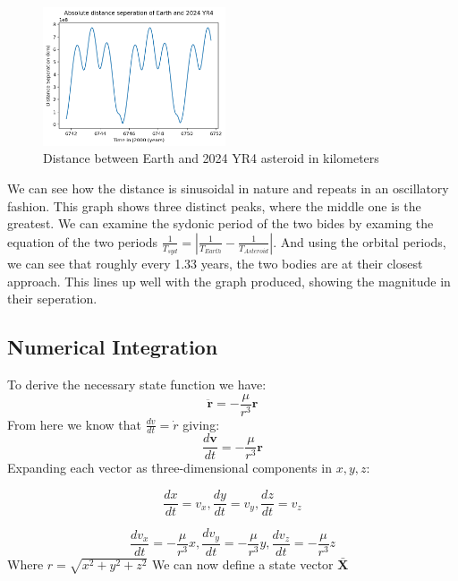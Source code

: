 \documentclass[12pt,twocolumn]{article}  %
\begin{document}
\begin{figure}[H]
    \centering
    \includegraphics[width=0.48\textwidth]{Images/115-dis.png}
    \caption{Distance between Earth and 2024 YR4 asteroid in kilometers}
\end{figure}

\noindent We can see how the distance is sinusoidal in nature and repeats in an oscillatory fashion. 
This graph shows three distinct peaks, where the middle one is the greatest. We can examine the sydonic period of 
the two bides by examing the equation of the two periods $\frac{1}{T_{syd}} = |\frac{1}{T_{Earth}} - \frac{1}{T_{Asteroid}}|$. And using the orbital periods,
we can see that roughly every 1.33 years, the two bodies are at their closest approach. This lines up well with the graph produced,
showing the magnitude in their seperation. 


\subsection{Numerical Integration}
To derive the necessary state function we have:
\begin{equation}
    \ddot{\mathbf{r}} = -\frac{\mu}{r^3} \mathbf{r}
\end{equation}
From here we know that $\frac{dv}{dt} = \dot{r}$ giving:
\begin{equation}
    \frac{d\mathbf{v}}{dt} = -\frac{\mu}{r^3} \mathbf{r}
\end{equation}
Expanding each vector as three-dimensional components in $x,y,z$:

\begin{equation}
    \frac{dx}{dt} = v_{x},  \frac{dy}{dt} = v_{y},   \frac{dz}{dt} = v_{z}
\end{equation}


\begin{equation}
    \frac{dv_{x}}{dt} = -\frac{\mu}{r^3} x, \frac{dv_{y}}{dt} = -\frac{\mu}{r^3} y, \frac{dv_{z}}{dt} = -\frac{\mu}{r^3} z
\end{equation}
Where $r = \sqrt{x^{2} + y^{2} + z^{2}}$
\newline
We can now define a state vector $\mathbf{\bar{X}}$
\end{document}

